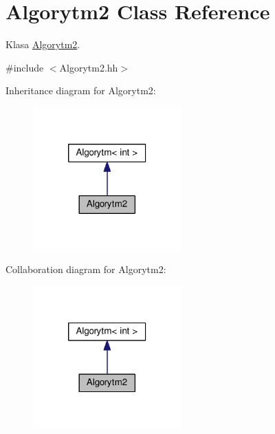 \hypertarget{a00003}{}\section{Algorytm2 Class Reference}
\label{a00003}


Klasa \hyperlink{a00003}{Algorytm2}.  




{\ttfamily \#include $<$Algorytm2.\+hh$>$}



Inheritance diagram for Algorytm2\+:
\nopagebreak
\begin{figure}[H]
\begin{center}
\leavevmode
\includegraphics[width=162pt]{a00121}
\end{center}
\end{figure}


Collaboration diagram for Algorytm2\+:
\nopagebreak
\begin{figure}[H]
\begin{center}
\leavevmode
\includegraphics[width=162pt]{a00122}
\end{center}
\end{figure}
